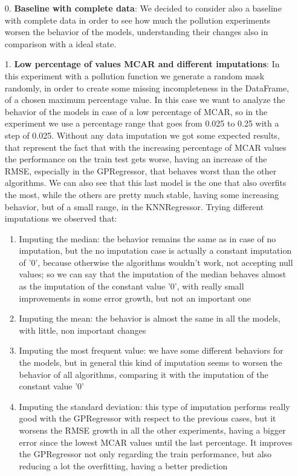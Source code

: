 \documentclass{Configuration_Files/PoliMi3i_thesis}
\begin{document}
\begin{enumerate}
\item[0.] \textbf{Baseline with complete data}: We decided to consider also a baseline with complete data in order to see how much the pollution experiments worsen the behavior of the models, understanding their changes also in comparison with a ideal state. 
\item[1.] \textbf{Low percentage of values MCAR and different imputations}: In this experiment with a pollution function we generate a random mask randomly, in order to create some missing incompleteness in the DataFrame, of a chosen maximum percentage value. In this case we want to analyze the behavior of the models in case of a low percentage of MCAR, so in the experiment we use a percentage range that goes from 0.025 to 0.25 with a step of 0.025. Without any data imputation we got some expected results, that represent the fact that with the increasing percentage of MCAR values the performance on the train test gets worse, having an increase of the RMSE, especially in the GPRegressor, that behaves worst than the other algorithms. We can also see that this last model is the one that also overfits the most, while the others are pretty much stable, having some increasing behavior, but of a small range, in the KNNRegressor. Trying different imputations we observed that:
\begin{enumerate}
    \item Imputing the median: the behavior remains the same as in case of no imputation, but the no imputation case is actually a constant imputation of '0', because otherwise the algorithms wouldn't work, not accepting null values; so we can say that the imputation of the median behaves almost as the imputation of the constant value '0', with really small improvements in some error growth, but not an important one
    \item Imputing the mean: the behavior is almost the same in all the models, with little, non important changes
    \item Imputing the most frequent value: we have some different behaviors for the models, but in general this kind of imputation seems to worsen the behavior of all algorithms, comparing it with the imputation of the constant value '0'
    \item Imputing the standard deviation: this type of imputation performs really good with the GPRegressor with respect to the previous cases, but it worsens the RMSE growth in all the other experiments, having a bigger error since the lowest MCAR values until the last percentage. It improves the GPRegressor not only regarding the train performance, but also reducing a lot the overfitting, having a better prediction 

\end{enumerate}
\end{enumerate}
\end{document}
